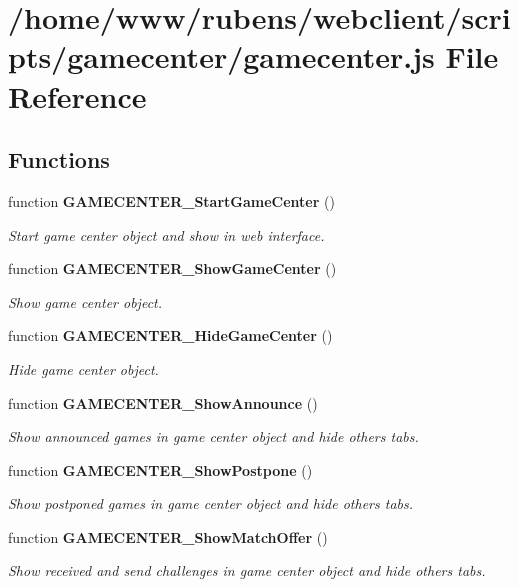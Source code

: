 \section{/home/www/rubens/webclient/scripts/gamecenter/gamecenter.js File Reference}
\label{gamecenter_2gamecenter_8js}
\subsection*{Functions}
\begin{CompactItemize}
\item 
function {\bf GAMECENTER\_\-StartGameCenter} ()
\begin{CompactList}\small\item\em Start game center object and show in web interface. \item\end{CompactList}\item 
function {\bf GAMECENTER\_\-ShowGameCenter} ()
\begin{CompactList}\small\item\em Show game center object. \item\end{CompactList}\item 
function {\bf GAMECENTER\_\-HideGameCenter} ()
\begin{CompactList}\small\item\em Hide game center object. \item\end{CompactList}\item 
function {\bf GAMECENTER\_\-ShowAnnounce} ()
\begin{CompactList}\small\item\em Show announced games in game center object and hide others tabs. \item\end{CompactList}\item 
function {\bf GAMECENTER\_\-ShowPostpone} ()
\begin{CompactList}\small\item\em Show postponed games in game center object and hide others tabs. \item\end{CompactList}\item 
function {\bf GAMECENTER\_\-ShowMatchOffer} ()
\begin{CompactList}\small\item\em Show received and send challenges in game center object and hide others tabs. \item\end{CompactList}\item 

\end{CompactItemize}
